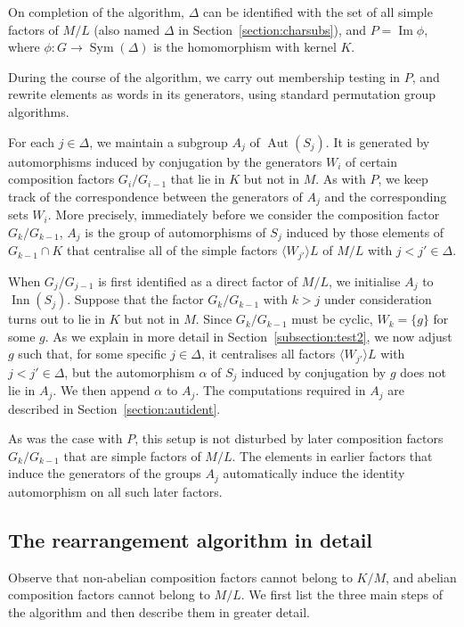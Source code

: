\documentclass[12pt,twoside,reqno,psamsfonts]{amsproc}
\numberwithin{equation}{section}
\numberwithin{figure}{section}
\newcounter{algorithm}
\theoremstyle{plain}
\theoremstyle{definition}
\theoremstyle{remark}
\providecommand{\Sym}[1]{\operatorname{Sym}( #1 )}
\DeclareMathOperator{\Aut}{Aut}
\DeclareMathOperator{\Inn}{Inn}
\DeclareMathOperator{\Imm}{Im}
\begin{document}
On completion of the algorithm, $\Delta$ can be identified with the set
of all simple factors of $M/L$ (also named $\Delta$
in Section~\ref{section:charsubs}), and $P = \Imm\phi$,
where $\phi:G\to \Sym{\Delta}$ is the homomorphism with kernel $K$.

During the course of the algorithm, we carry out
membership testing in $P$, and rewrite elements as words
in its generators, using standard permutation group algorithms.

For each $j \in \Delta$, we maintain a subgroup $A_j$ of
$\Aut(S_j)$.  It is generated by
automorphisms induced by conjugation by the generators $W_i$ of certain
composition factors $G_i/G_{i-1}$ that lie in $K$ but not in $M$. As with 
$P$, we keep track of the correspondence between the generators of $A_j$
and the corresponding sets $W_i$.
More precisely, immediately before we consider the composition factor
$G_k/G_{k-1}$, $A_j$ is the group of automorphisms of $S_j$ induced by
those elements of $G_{k-1} \cap K$ that centralise all of the simple factors
$\langle W_{j'} \rangle L$ of $M/L$ with $j < j' \in \Delta$. 

When $G_j/G_{j-1}$ is first identified as a direct factor of $M/L$,
we initialise $A_j$ to $\Inn(S_j)$.
Suppose that the factor $G_k/G_{k-1}$ with $k>j$ under consideration
turns out to lie in $K$ but not in $M$.  Since $G_k/G_{k-1}$ must be cyclic,
$W_k = \{g\}$ for some $g$.  As we 
explain in more detail in Section~\ref{subsection:test2},
we now adjust $g$ such that, for some specific $j \in \Delta$,
it centralises all factors $\langle W_{j'} \rangle L$ with
$j < j' \in \Delta$, but the automorphism $\alpha$  of $S_j$ induced
by conjugation by $g$ does not lie in $A_j$. We then append $\alpha$ to $A_j$.
The computations required in $A_j$
are described in Section~\ref{section:autident}.

As was the case with $P$, this setup is not disturbed by
later composition factors  $G_k/G_{k-1}$ that are simple factors of
$M/L$. The elements in earlier factors that induce the generators of
the groups $A_j$ automatically induce the identity automorphism on
all such later factors.

\subsection{The rearrangement algorithm in detail}
Observe that non-abelian composition factors cannot belong to $K/M$,
and abelian composition factors cannot belong to $M/L$.
We first list the three main steps of the algorithm and then describe them in
greater detail.
\end{document}
